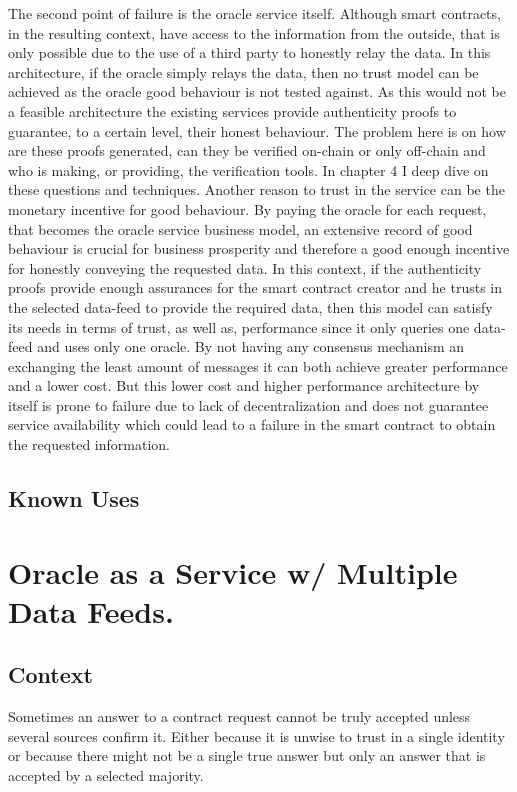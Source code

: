 The second point of failure is the oracle service itself. Although smart contracts, in the resulting context, have access to the information from the outside, that is only possible due to the use of a third party to honestly relay the data. In this architecture, if the oracle simply relays the data, then no trust model can be achieved as the oracle good behaviour is not tested against. As this would not be a feasible architecture the existing services provide authenticity proofs to guarantee, to a certain level, their honest behaviour. The problem here is on how are these proofs generated, can they be verified on-chain or only off-chain and who is making, or providing, the verification tools. In chapter 4 I deep dive on these questions and techniques. Another reason to trust in the service can be the monetary incentive for good behaviour. By paying the oracle for each request, that becomes the oracle service business model, an extensive record of good behaviour is crucial for business prosperity and therefore a good enough incentive for honestly conveying the requested data.
In this context, if the authenticity proofs provide enough assurances for the smart contract creator and he trusts in the selected data-feed to provide the required data, then this model can satisfy its needs in terms of trust, as well as, performance since it only queries one data-feed and uses only one oracle. By not having any consensus mechanism an exchanging the least amount of messages it can both achieve greater performance and a lower cost. But this lower cost and higher performance architecture by itself is prone to failure due to lack of decentralization and does not guarantee service availability which could lead to a failure in the smart contract to obtain the requested information.

\subsection{Known Uses}


\section{Oracle as a Service w/ Multiple Data Feeds.}\label{OaaSwMultipleDataFeed}

\subsection{Context}
Sometimes an answer to a contract request cannot be truly accepted unless several sources confirm it. Either because it is unwise to trust in a single identity or because there might not be a single true answer but only an answer that is accepted by a selected majority.

